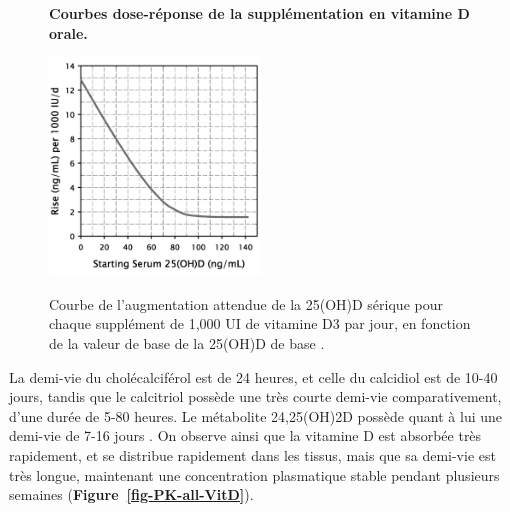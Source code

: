 \documentclass[
  a4paper,
  DIV=11,
  numbers=noendperiod,
  listof=totoc]{scrreprt}
\begin{document}
\begin{figure}
\begin{subfigure}{0.48\textwidth}
        \label{subfig:vd-dose-imc}
    \end{subfigure}
    \caption{\textbf{Courbes dose-réponse de la supplémentation en vitamine D orale.}}
    \label{fig:dose-response}
\end{figure}

\begin{figure}
    \centering
        \centering
        \includegraphics[width=0.5\textwidth]{figures/vd-expected-rise.jpeg}
        \label{fig-vd-expected-rise}
        \caption[Courbe de l'augmentation attendue de la 25(OH)D sérique pour chaque supplément de 1,000 UI de vitamine D3 par jour, en fonction de la valeur de base de la 25(OH)D de base]{Courbe de l'augmentation attendue de la 25(OH)D sérique pour chaque supplément de 1,000 UI de vitamine D3 par jour, en fonction de la valeur de base de la 25(OH)D de base \textcite{Garland.2011}.}
\end{figure}

La demi-vie du cholécalciférol est de 24 heures, et celle du calcidiol
est de 10-40 jours, tandis que le calcitriol possède une très courte
demi-vie comparativement, d'une durée de 5-80 heures. Le métabolite
24,25(OH)2D possède quant à lui une demi-vie de 7-16 jours
\autocite{Schoenmakers.2018}. On observe ainsi que la vitamine D est
absorbée très rapidement, et se distribue rapidement dans les tissus,
mais que sa demi-vie est très longue, maintenant une concentration
plasmatique stable pendant plusieurs semaines
(\textbf{Figure~\ref{fig-PK-all-VitD}}).
\end{document}
